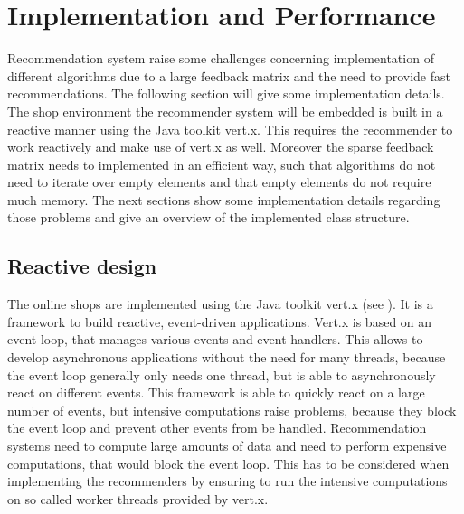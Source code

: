 \documentclass[10pt]{reportMaster}
\begin{document}
\chapter{Implementation and Performance}
\label{chap:ImplemenationAndPerformance}
Recommendation system raise some challenges concerning implementation of different algorithms due to a large feedback matrix and the need to provide fast recommendations.
The following section will give some implementation details. 
The shop environment the recommender system will be embedded is built in a reactive manner using the Java toolkit vert.x.
This requires the recommender to work reactively and make use of vert.x as well.
Moreover the sparse feedback matrix needs to implemented in an efficient way, such that algorithms do not need to iterate over empty elements and that empty elements do not require much memory.
The next sections show some implementation details regarding those problems and give an overview of the implemented class structure.

\section{Reactive design}
\label{sec:ReactiveDesign}
The online shops are implemented using the Java toolkit vert.x (see \cite{vertx}).
It is a framework to build reactive, event-driven applications.
Vert.x is based on an event loop, that manages various events and event handlers.
This allows to develop asynchronous applications without the need for many threads, because the event loop generally only needs one thread, but is able to asynchronously react on different events.
This framework is able to quickly react on a large number of events, but intensive computations raise problems, because they block the event loop and prevent other events from be handled.
Recommendation systems need to compute large amounts of data and need to perform expensive computations, that would block the event loop.
This has to be considered when implementing the recommenders by ensuring to run the intensive computations on so called worker threads provided by vert.x.
\end{document}
